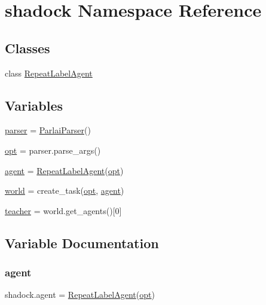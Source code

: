 \hypertarget{namespaceshadock}{}\section{shadock Namespace Reference}
\label{namespaceshadock}
\subsection*{Classes}
\begin{DoxyCompactItemize}
\item 
class \hyperlink{classshadock_1_1RepeatLabelAgent}{Repeat\+Label\+Agent}
\end{DoxyCompactItemize}
\subsection*{Variables}
\begin{DoxyCompactItemize}
\item 
\hyperlink{namespaceshadock_aa4e07d2eebb7832812fa751fcc89196b}{parser} = \hyperlink{classparlai_1_1core_1_1params_1_1ParlaiParser}{Parlai\+Parser}()
\item 
\hyperlink{namespaceshadock_a1f0720d3750ae2bb3fbbaad0fd0e33ae}{opt} = parser.\+parse\+\_\+args()
\item 
\hyperlink{namespaceshadock_ad75e4ea6fe08d47d4a18de24b6bc2455}{agent} = \hyperlink{classshadock_1_1RepeatLabelAgent}{Repeat\+Label\+Agent}(\hyperlink{namespaceshadock_a1f0720d3750ae2bb3fbbaad0fd0e33ae}{opt})
\item 
\hyperlink{namespaceshadock_a7a57065851adb01a5966c61a702b2748}{world} = create\+\_\+task(\hyperlink{namespaceshadock_a1f0720d3750ae2bb3fbbaad0fd0e33ae}{opt}, \hyperlink{namespaceshadock_ad75e4ea6fe08d47d4a18de24b6bc2455}{agent})
\item 
\hyperlink{namespaceshadock_abc8ed101017c61d6a944f70094e73277}{teacher} = world.\+get\+\_\+agents()\mbox{[}0\mbox{]}
\end{DoxyCompactItemize}


\subsection{Variable Documentation}
\mbox{\label{namespaceshadock_ad75e4ea6fe08d47d4a18de24b6bc2455}} 
\subsubsection{\texorpdfstring{agent}{agent}}
{\footnotesize\ttfamily shadock.\+agent = \hyperlink{classshadock_1_1RepeatLabelAgent}{Repeat\+Label\+Agent}(\hyperlink{namespaceshadock_a1f0720d3750ae2bb3fbbaad0fd0e33ae}{opt})}

